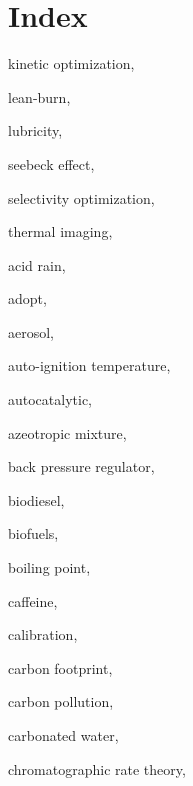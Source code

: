 
\chapter{Index} %



\begin{theindex}

  \item \lowercase {Kinetic optimization}, 
  \item \lowercase {Lean-burn}, 
  \item \lowercase {Lubricity}, 
  \item \lowercase {Seebeck effect}, 
  \item \lowercase {Selectivity optimization}, 
  \item \lowercase {Thermal imaging}, 
  \item \lowercase {acid rain}, 
  \item \lowercase {adopt}, 
  \item \lowercase {aerosol}, 
  \item \lowercase {auto-ignition temperature}, 
  \item \lowercase {autocatalytic}, 
  \item \lowercase {azeotropic mixture}, 
  \item \lowercase {back pressure regulator}, 
  \item \lowercase {biodiesel}, 
  \item \lowercase {biofuels}, 
  \item \lowercase {boiling point}, 
  \item \lowercase {caffeine}, 
  \item \lowercase {calibration}, 
  \item \lowercase {carbon footprint}, 
  \item \lowercase {carbon pollution}, 
  \item \lowercase {carbonated water}, 
  \item \lowercase {chromatographic rate theory}, 

\end{theindex}
